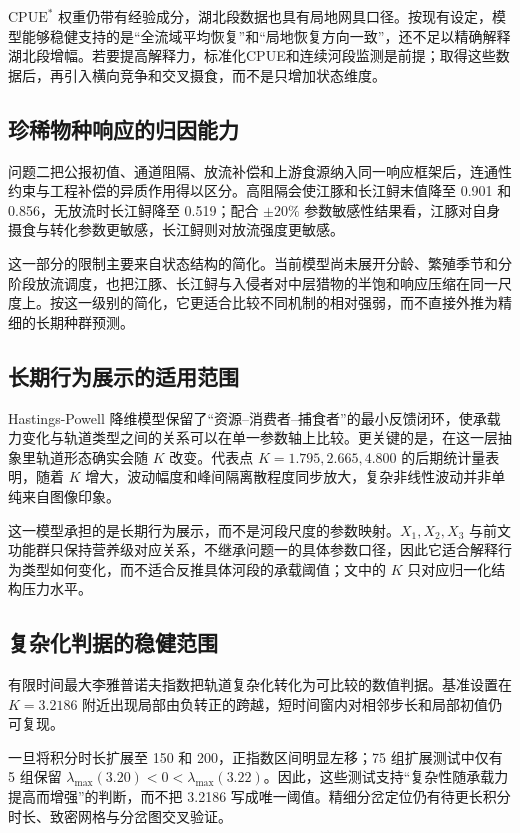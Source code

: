 \documentclass{MMCStyle}
\begin{document}
$\mathrm{CPUE}^*$ 权重仍带有经验成分，湖北段数据也具有局地网具口径。按现有设定，模型能够稳健支持的是“全流域平均恢复”和“局地恢复方向一致”，还不足以精确解释湖北段增幅。若要提高解释力，标准化CPUE和连续河段监测是前提；取得这些数据后，再引入横向竞争和交叉摄食，而不是只增加状态维度。

\subsection{珍稀物种响应的归因能力}
问题二把公报初值、通道阻隔、放流补偿和上游食源纳入同一响应框架后，连通性约束与工程补偿的异质作用得以区分。高阻隔会使江豚和长江鲟末值降至 0.901 和 0.856，无放流时长江鲟降至 0.519；配合 $\pm 20\%$ 参数敏感性结果看，江豚对自身摄食与转化参数更敏感，长江鲟则对放流强度更敏感。

这一部分的限制主要来自状态结构的简化。当前模型尚未展开分龄、繁殖季节和分阶段放流调度，也把江豚、长江鲟与入侵者对中层猎物的半饱和响应压缩在同一尺度上。按这一级别的简化，它更适合比较不同机制的相对强弱，而不直接外推为精细的长期种群预测。

\subsection{长期行为展示的适用范围}
Hastings-Powell 降维模型保留了“资源--消费者--捕食者”的最小反馈闭环，使承载力变化与轨道类型之间的关系可以在单一参数轴上比较。更关键的是，在这一层抽象里轨道形态确实会随 $K$ 改变。代表点 $K=1.795,2.665,4.800$ 的后期统计量表明，随着 $K$ 增大，波动幅度和峰间隔离散程度同步放大，复杂非线性波动并非单纯来自图像印象。

这一模型承担的是长期行为展示，而不是河段尺度的参数映射。$X_1,X_2,X_3$ 与前文功能群只保持营养级对应关系，不继承问题一的具体参数口径，因此它适合解释行为类型如何变化，而不适合反推具体河段的承载阈值；文中的 $K$ 只对应归一化结构压力水平。

\subsection{复杂化判据的稳健范围}
有限时间最大李雅普诺夫指数把轨道复杂化转化为可比较的数值判据。基准设置在 $K=3.2186$ 附近出现局部由负转正的跨越，短时间窗内对相邻步长和局部初值仍可复现。

一旦将积分时长扩展至 150 和 200，正指数区间明显左移；75 组扩展测试中仅有 5 组保留 $\lambda_{\max}(3.20)<0<\lambda_{\max}(3.22)$。因此，这些测试支持“复杂性随承载力提高而增强”的判断，而不把 3.2186 写成唯一阈值。精细分岔定位仍有待更长积分时长、致密网格与分岔图交叉验证。
\end{document}
